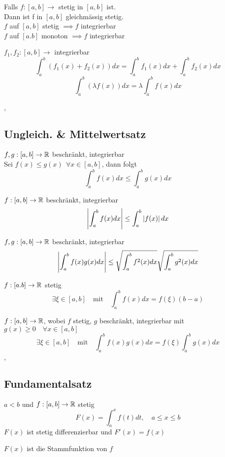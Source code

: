 \Satz[5.2.6] Falls $f : [a, b] \rightarrow $ stetig in $[a, b]$ ist. \\
Dann ist f in $[a,b]$ gleichmässig stetig. \\

\Satz[5.2.7] $f$ auf $[a, b ]$ stetig $\implies f$ integrierbar \\

\Satz[5.2.8] $f$ auf $[a.b]$ monoton $\implies f$ integrierbar

\Satz[5.2.10] $f_1, f_2 : [a,b] \rightarrow$ integrierbar
\[\int_{a}^{b} (f_1(x) + f_2(x)) dx = \int_{a}^{b} f_1(x) dx + \int_{a}^{b} f_2(x) dx \]
\[\int_{a}^{b} (\lambda f(x)) dx = \lambda \int_{a}^{b} f(x) dx \]

\sep

\subsection{Ungleich. \& Mittelwertsatz}

\Satz[5.3.1] $f, g : [a,b] \rightarrow \mathbb{R}$ beschränkt, integrierbar \\
Sei \(f(x) \leq g(x) \ \ \forall x \in [a,b] \), dann folgt
\[ \int_{a}^{b} f(x) dx \leq \int_{a}^{b} g(x) dx \]

\Korollar[5.3.2] $f : [a, b] \rightarrow \mathbb{R}$ beschränkt, integrierbar
\[ \left\lvert \int_{a}^{b} f(x) dx \right\rvert \leq \int_{a}^{b} \left\lvert f(x) \right\rvert dx \]

\Satz[5.3.3] $f, g : [a,b] \rightarrow \mathbb{R}$ beschränkt, integrierbar
\[ \left\lvert  \int_a^b f(x) g(x) dx  \right\rvert \leq \sqrt{\int_a^b f^2(x) dx} \sqrt{\int_a^b g^2(x) dx} \] 

\Satz[5.3.4] $f : [a.b] \rightarrow \mathbb{R}$ stetig
\[ \exists \xi \in [a, b] \quad \text{mit} \quad \int_a^b f(x) dx = f(\xi) (b-a) \]

\Satz[5.3.6] $ f: [a, b] \rightarrow \mathbb{R}$, wobei $f$ stetig, $g$ beschränkt, integrierbar mit $g(x) \geq 0 \quad \forall x \in [a,b]$
\[ \exists \xi \in [a, b] \quad \text{mit} \quad \int_a^b f(x) g(x) dx = f(\xi) \int_a^b g(x) dx  \]
\sep

\subsection{Fundamentalsatz}

\Satz[5.4.1] $a < b$ und $f : [a,b] \rightarrow \mathbb{R}$ stetig
\[ F(x) = \int_a^x f(t) dt, \quad a \leq x \leq b \]
$F(x)$ ist stetig differenzierbar und $F'(x) = f(x)$

\Def[5.4.2] $F(x)$ ist die Stammfunktion von $f$ \\

